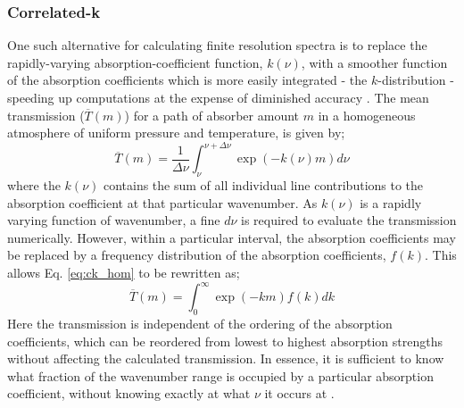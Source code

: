 \documentclass[final,5p,times,twocolumn,authoryear]{elsarticle}
\begin{document}
\subsubsection{Correlated-k}

One such alternative for calculating finite resolution spectra is to replace the rapidly-varying absorption-coefficient function, $k(\nu)$, with a smoother function of the absorption coefficients which is more easily integrated - the $k$-distribution - speeding up computations at the expense of diminished accuracy \citet{89goody}.  The mean transmission ($\overline{T}(m)$) for a path of absorber amount $m$ in a homogeneous atmosphere of uniform pressure and temperature, is given by;
\begin{equation}
\overline{T}(m)=\frac{1}{\Delta \nu} \int^{\nu+\Delta \nu}_{\nu} \exp(-k(\nu)m) d\nu
\label{eq:ck_hom}
\end{equation}
where the $k(\nu)$ contains the sum of all individual line contributions to the absorption coefficient at that particular wavenumber.  As $k(\nu)$ is a rapidly varying function of wavenumber, a fine $d\nu$ is required to evaluate the transmission numerically.  However, within a particular interval, the absorption coefficients may be replaced by a frequency distribution of the absorption coefficients, $f(k)$.  This allows Eq. \ref{eq:ck_hom} to be rewritten as;
\begin{equation}
\overline{T}(m)=\int^{\infty}_{0} \exp(-km) f(k)dk
\end{equation}
Here the transmission is independent of the ordering of the absorption coefficients, which can be reordered from lowest to highest absorption strengths without affecting the calculated transmission.  In essence, it is sufficient to know what fraction of the wavenumber range is occupied by a particular absorption coefficient, without knowing exactly at what $\nu$ it occurs at \citep{03irwbook, 91lacis}.
\end{document}
